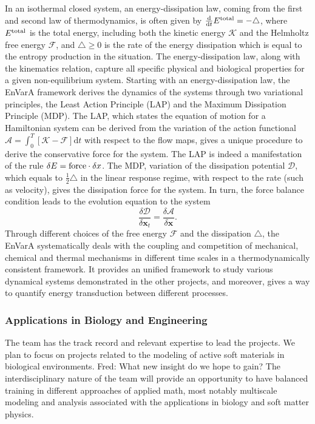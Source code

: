 \documentclass[11pt]{NSFamsart}
\newcommand{\dd}{\mathrm{d}}
\newcommand{\x}{{\bm x}}
\newcommand{\FredNote}[1]{{\color{blue} Fred: #1}}
\begin{document}
In an isothermal closed system, an energy-dissipation law, coming from the first and second law of thermodynamics, is often given by $\frac{\dd}{\dd t} E^{\rm total} = - \triangle$,
where $E^{\rm total}$ is the total energy, including both the kinetic energy $\mathcal{K}$ and the Helmholtz free energy $\mathcal{F}$, and $\triangle \geq 0$ is the rate of the energy dissipation which is equal to the entropy production in the situation. The energy-dissipation law, along with the kinematics relation, %
capture all specific physical and biological properties for a given non-equilibrium system. Starting with an energy-dissipation law, the EnVarA framework derives the dynamics of the systems through two variational principles, the Least Action Principle (LAP) and the Maximum Dissipation Principle (MDP). The LAP, which states the equation of motion for a Hamiltonian system
can be derived from the variation of the action functional $\mathcal{A} = \int_{0}^T [\mathcal{K} - \mathcal{F}] \dd t$ with respect to the flow maps, gives a unique procedure to derive the conservative force for the system. The LAP is indeed a manifestation of the rule $\delta E = {\rm force} \cdot \delta x$. The MDP, variation of the dissipation potential $\mathcal{D}$, which equals to $\frac{1}{2}\triangle$ in the linear response regime, with respect to the rate (such as velocity), gives the dissipation force for the system. In turn, the force balance condition leads to the evolution equation to the system
\begin{equation*}
\frac{\delta \mathcal{D}}{\delta \x_t} = \frac{\delta \mathcal{A}}{\delta \x}.
\end{equation*}
Through different choices of the free energy $\mathcal{F}$ and the dissipation $\triangle$,
the EnVarA %
systematically deals with the coupling and competition of mechanical, chemical and thermal mechanisms in different time scales in a thermodynamically consistent framework. It 
provides an unified framework to study various
dynamical systems demonstrated in the other projects, and
moreover, gives a way to quantify energy transduction between different processes.  

\subsubsection*{Applications in Biology and Engineering}
The team has the track record and relevant expertise to lead the projects. We plan to focus on projects related to the modeling of active soft materials in biological environments. \FredNote{What new insight do we hope to gain?}
The interdisciplinary nature of the team will provide an opportunity to have balanced training in different approaches of applied math, most notably multiscale modeling and analysis associated with the applications in biology and soft matter physics.
\end{document}
